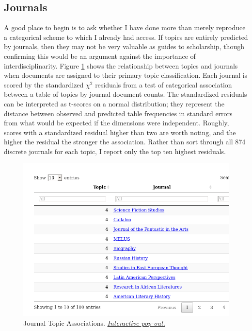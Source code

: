 \documentclass[]{book}
\theoremstyle{definition}
\theoremstyle{definition}
\theoremstyle{definition}
\theoremstyle{remark}
\begin{document}
\hypertarget{journals}{%
\subsection{Journals}\label{journals}}

A good place to begin is to ask whether I have done more than merely
reproduce a categorical scheme to which I already had access. If topics
are entirely predicted by journals, then they may not be very valuable
as guides to scholarship, though confirming this would be an argument
against the importance of interdisciplinarity. Figure \ref{fig:jourchi}
shows the relationship between topics and journals when documents are
assigned to their primary topic classification. Each journal is scored
by the standardized \(\chi^2\) residuals from a test of categorical
association between a table of topics by journal document counts. The
standardized residuals can be interpreted as t-scores on a normal
distribution; they represent the distance between observed and predicted
table frequencies in standard errors from what would be expected if the
dimensions were independent. Roughly, scores with a standardized
residual higher than two are worth noting, and the higher the residual
the stronger the association. Rather than sort through all 874 discrete
journals for each topic, I report only the top ten highest residuals.





\begin{figure}

{\centering \includegraphics[width=0.9\linewidth]{03_files/figure-latex/jourchi-1} 

}

\caption{Journal Topic Associations.
\href{https://brooksambrose.github.io/portfolio/exh/jourchi.html}{\emph{Interactive
pop-out.}}}\label{fig:jourchi}
\end{figure}
\end{document}
